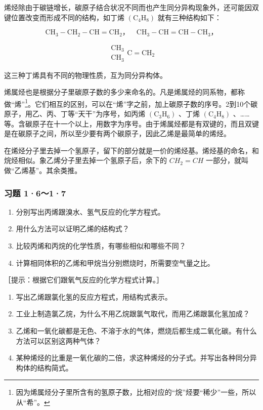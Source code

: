 烯烃除由于碳链增长，碳原子结合状况不同而也产生同分异构现象外，还可能因双键位置改变而形成不同的结构，如丁烯
\(\left(\mathrm{C}_{4}\mathrm{H}_{8}\right)\) 就有三种结构如下：

\[
\mathrm{CH} _ {3} - \mathrm{CH} _ {2} - \mathrm{CH} = \mathrm{CH} _ {2}\text{，} \quad \mathrm{CH} _ {3} - \mathrm{CH} = \mathrm{CH} - \mathrm{CH} _ {3}\text{，}
\]

\[
\begin{array}{c} \mathrm{CH} _ {3} \\ \mathrm{CH} _ {3} \end{array} \mathrm{C} = \mathrm{CH} _ {2}
\]

这三种丁烯具有不同的物理性质，互为同分异构体。

烯属烃也是根据分子里碳原子数的多少来命名的。凡是烯属烃的同系物，都称做``烯''\footnote{因为烯属烃分子里所含有的氢原子数，比相对应的``烷''烃要``稀少''一些，所以从``希''。}。它们相互的区别，可以在``烯''字之前，加上碳原子数的序号。2到10个碳原子，用乙、丙、丁等``天干''为序号，如丙烯
\(\left(\mathrm{C}_{3}\mathrm{H}_{6}\right)\) 、丁烯
\(\left(\mathrm{C}_{4}\mathrm{H}_{8}\right)\)
、\ldots\ldots 等。含碳原子在十一个以上，用数字为序号。由于烯属烃都是有双键的，而且双键是在碳原子之间，所以至少要有两个碳原子，因此乙烯是最简单的烯烃。

在烯烃分子里去掉一个氢原子，留下的部分就是一价的烯烃基。烯烃基的命名，和烷烃相似。象乙烯分子里去掉一个氢原子后，余下的
\(CH_{2}=CH\) 一部分，就叫做``乙烯基''。其余类推。

\subsubsection{习题 1·6～1·7}

\begin{enumerate}
\item
  分别写出丙烯跟溴水、氢气反应的化学方程式。
\item
  用什么方法可以证明乙烯的结构式？
\item
  比较丙烯和丙烷的化学性质，有哪些相似和哪些不同？
\item
  计算相同体积的乙烯和甲烷当分别燃烧时，所需要空气量之比。
\end{enumerate}

［提示：根据它们跟氧气反应的化学方程式计算。］

\begin{enumerate}[start=5]
\item
  写出乙烯跟氯化氢的反应方程式，用结构式表示。
\item
  工业上制造氯乙烷，为什么不用乙烷跟氯气取代，而用乙烯跟氯化氢加成？
\item
  乙烯和一氧化碳都是无色、不溶于水的气体，燃烧后都生成二氧化碳。有什么方法可以区别这两种气体？
\item
  某种烯烃的比重是一氧化碳的二倍，求这种烯烃的分子式。并写出各种同分异构体的结构简式。
\end{enumerate}

